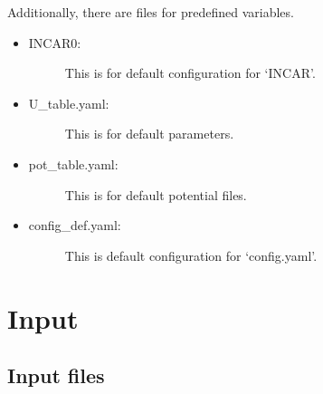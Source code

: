 \documentclass[letterpaper,10pt,english]{sphinxmanual}
\begin{document}
Additionally, there are files for predefined variables.
\begin{itemize}
\item {} \begin{description}
\item[{INCAR0:}] \leavevmode
This is for default configuration for ‘INCAR’.

\end{description}

\item {} \begin{description}
\item[{U\_table.yaml:}] \leavevmode
This is for default  parameters.

\end{description}

\item {} \begin{description}
\item[{pot\_table.yaml:}] \leavevmode
This is for default potential files.

\end{description}

\item {} \begin{description}
\item[{config\_def.yaml:}] \leavevmode
This is default configuration for ‘config.yaml’.

\end{description}

\end{itemize}


\chapter{Input}
\label{\detokenize{Input/Input:input}}\label{\detokenize{Input/Input::doc}}

\section{Input files}
\label{\detokenize{Input/Input_files:input-files}}\label{\detokenize{Input/Input_files::doc}}
\end{document}
